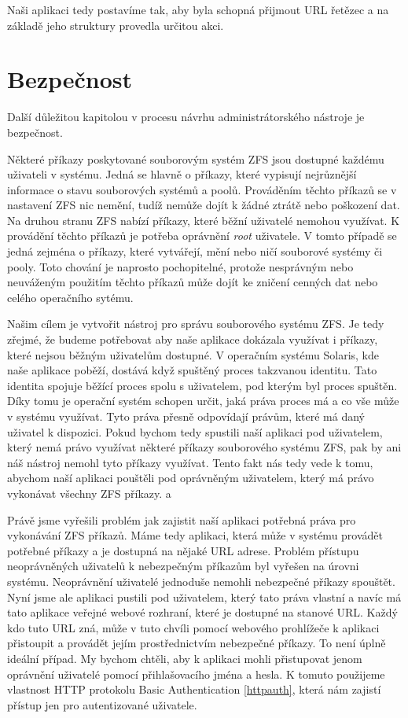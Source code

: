 Naši aplikaci tedy postavíme tak, aby byla schopná přijmout URL řetězec a na základě jeho struktury provedla určitou akci.
\section{Bezpečnost}
Další důležitou kapitolou v procesu návrhu administrátorského nástroje je bezpečnost.

Některé příkazy poskytované souborovým systém ZFS jsou dostupné každému uživateli v systému. Jedná se hlavně o příkazy, které vypisují nejrůznější informace o stavu souborových systémů a poolů. Prováděním těchto příkazů se v nastavení ZFS nic nemění, tudíž nemůže dojít k žádné ztrátě nebo poškození dat. Na druhou stranu ZFS nabízí příkazy, které běžní uživatelé nemohou využívat. K provádění těchto příkazů je potřeba oprávnění \emph{root} uživatele. V tomto případě se jedná zejména o příkazy, které vytvářejí, mění nebo ničí souborové systémy či pooly. Toto chování je naprosto pochopitelné, protože nesprávným nebo neuváženým použitím těchto příkazů může dojít ke zničení cenných dat nebo celého operačního sytému.

Našim cílem je vytvořit nástroj pro správu souborového systému ZFS. Je tedy zřejmé, že budeme potřebovat aby naše aplikace dokázala využívat i příkazy, které nejsou běžným uživatelům dostupné. V operačním systému Solaris, kde naše aplikace poběží, dostává když spuštěný proces takzvanou identitu. Tato identita spojuje běžící proces spolu s uživatelem, pod kterým byl proces spuštěn. Díky tomu je operační systém schopen určit, jaká práva proces má a co vše může v systému využívat. Tyto práva přesně odpovídají právům, které má daný uživatel k dispozici. Pokud bychom tedy spustili naší aplikaci pod uživatelem, který nemá právo využívat některé příkazy souborového systému ZFS, pak by ani náš nástroj nemohl tyto příkazy využívat. Tento fakt nás tedy vede k tomu, abychom naší aplikaci pouštěli pod oprávněným uživatelem, který má právo vykonávat všechny ZFS příkazy. a

Právě jsme vyřešili problém jak zajistit naší aplikaci potřebná práva pro vykonávání ZFS příkazů. Máme tedy aplikaci, která může v systému provádět potřebné příkazy a je dostupná na nějaké URL adrese. Problém přístupu neoprávněných uživatelů k nebezpečným příkazům byl vyřešen na úrovni systému. Neoprávnění uživatelé jednoduše nemohli nebezpečné příkazy spouštět. Nyní jsme ale aplikaci pustili pod uživatelem, který tato práva vlastní a navíc má tato aplikace veřejné webové rozhraní, které je dostupné na stanové URL. Každý kdo tuto URL zná, může v tuto chvíli pomocí webového prohlížeče k aplikaci přistoupit a provádět jejím prostřednictvím nebezpečné příkazy. To není úplně ideální případ. My bychom chtěli, aby k aplikaci mohli přistupovat jenom oprávnění uživatelé pomocí přihlašovacího jména a hesla. K tomuto použijeme vlastnost HTTP protokolu Basic Authentication \ref{httpauth}, která nám zajistí přístup jen pro autentizované uživatele.

